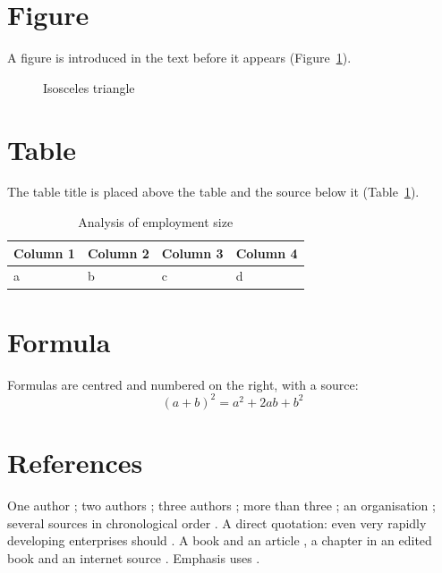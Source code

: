 
\section{Figure}
A figure is introduced in the text before it appears (Figure~\ref{fig:example}).

\begin{figure}[ht]
  \centering
  \caption{Isosceles triangle}\label{fig:example}
\end{figure}

\section{Table}
The table title is placed above the table and the source below it
(Table~\ref{tab:example}).

\begin{table}[ht]
  \caption{Analysis of employment size}\label{tab:example}
  \centering
  \begin{tabular}{llll}
    \toprule
    Column 1 & Column 2 & Column 3 & Column 4 \\
    \midrule
    a & b & c & d \\
    \bottomrule
  \end{tabular}
\end{table}

\section{Formula}
Formulas are centred and numbered on the right, with a source:
\begin{equation}
  (a+b)^2 = a^2 + 2ab + b^2
  \label{eq:example}
\end{equation}

\section{References}
One author \parencite[22]{Kowalski2001}; two authors
\parencite[13]{Antczak1994}; three authors \parencite[145]{Malinowski1999};
more than three \parencite[12]{Marczak2005}; an organisation
\parencite{GUS2009}; several sources in chronological order
\parencites[22]{Nowak1973}[55]{Malinowski1980}[47]{Adamski1999}.
A direct quotation: even very rapidly developing enterprises should
 \parencite[306]{Niedbala2010}. A book and an article
\parencite{Kowalski2011,Krol2009}, a chapter in an edited book
\parencite{Krol2011} and an internet source \parencite{audytor}.
Emphasis uses .
